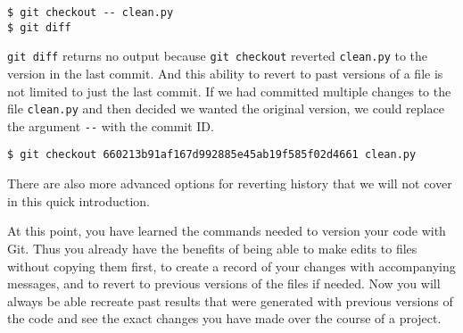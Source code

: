 \begin{lstlisting}
$ git checkout -- clean.py
$ git diff
\end{lstlisting}

\verb|git diff| returns no output because \verb|git checkout| reverted \verb|clean.py| to the version in the last commit.
And this ability to revert to past versions of a file is not limited to just the last commit.
If we had committed multiple changes to the file \verb|clean.py| and then decided we wanted the original version, we could replace the argument \verb|--| with the commit ID.

\begin{lstlisting}
$ git checkout 660213b91af167d992885e45ab19f585f02d4661 clean.py
\end{lstlisting}

There are also more advanced options for reverting history that we will not cover in this quick introduction.

At this point, you have learned the commands needed to version your code with Git.
Thus you already have the benefits of being able to make edits to files without copying them first, to create a record of your changes with accompanying messages, and to revert to previous versions of the files if needed.
Now you will always be able recreate past results that were generated with previous versions of the code and see the exact changes you have made over the course of a project.